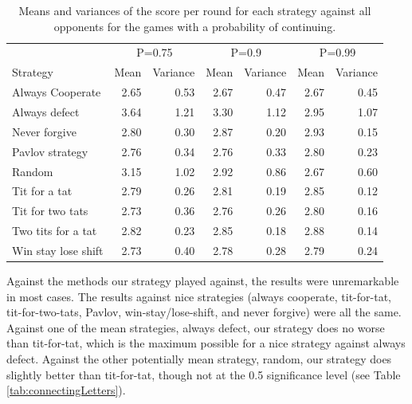 \documentclass[a4paper]{article}
\begin{document}
\begin{table}[h]
    \centering
\begin{tabular}{lrrrrrr}
                    & \multicolumn{2}{c}{P=0.75} & \multicolumn{2}{c}{P=0.9} & \multicolumn{2}{c}{P=0.99} \\
Strategy            & Mean       & Variance      & Mean      & Variance      & Mean       & Variance      \\ \hline
Always Cooperate    & 2.65       & 0.53          & 2.67      & 0.47          & 2.67       & 0.45          \\
Always defect       & 3.64       & 1.21          & 3.30      & 1.12          & 2.95       & 1.07          \\
Never forgive       & 2.80       & 0.30          & 2.87      & 0.20          & 2.93       & 0.15          \\
Pavlov strategy    & 2.76       & 0.34          & 2.76      & 0.33          & 2.80       & 0.23          \\
Random              & 3.15       & 1.02          & 2.92      & 0.86          & 2.67       & 0.60          \\
Tit for a tat       & 2.79       & 0.26          & 2.81      & 0.19          & 2.85       & 0.12          \\
Tit for two tats    & 2.73       & 0.36          & 2.76      & 0.26          & 2.80       & 0.16          \\
Two tits for a tat  & 2.82       & 0.23          & 2.85      & 0.18          & 2.88       & 0.14          \\
Win stay lose shift & 2.73       & 0.40          & 2.78      & 0.28          & 2.79       & 0.24         
\end{tabular}
    \caption{Means and variances of the score per round for each strategy against all opponents for the games with a probability of continuing.}
    \label{tab:probresults}
\end{table}

Against the methods our strategy played against, the results were unremarkable in most cases. The results against nice strategies (always cooperate, tit-for-tat, tit-for-two-tats, Pavlov, win-stay/lose-shift, and never forgive) were all the same. Against one of the mean strategies, always defect, our strategy does no worse than tit-for-tat, which is the maximum possible for a nice strategy against always defect. Against the other potentially mean strategy, random, our strategy does slightly better than tit-for-tat, though not at the 0.5 significance level (see Table \ref{tab:connectingLetters}).
\end{document}
